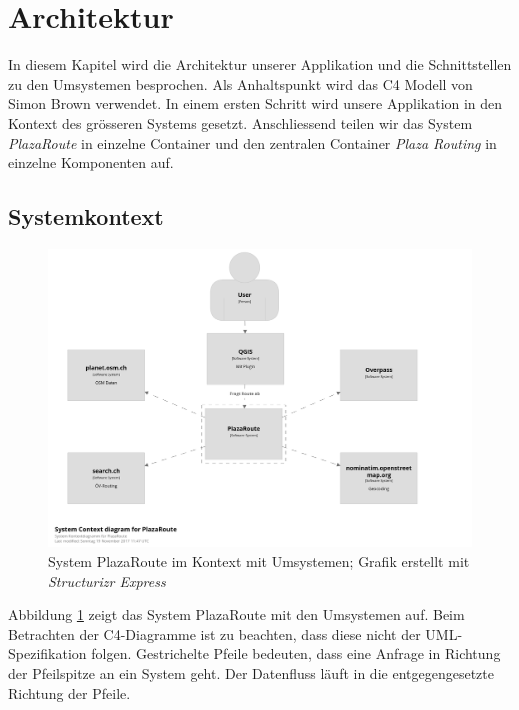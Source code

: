 
\section{Architektur}
\label{sec:Architektur}

In diesem Kapitel wird die Architektur unserer Applikation und die Schnittstellen zu den Umsystemen besprochen. Als Anhaltspunkt wird das C4 Modell \cite{c4model} von Simon Brown verwendet. In einem ersten Schritt wird unsere Applikation in den Kontext des grösseren Systems gesetzt. Anschliessend teilen wir das System \emph{PlazaRoute} in einzelne Container und den zentralen Container \emph{Plaza Routing} in einzelne Komponenten auf.

\subsection{Systemkontext}
\label{architektur:Systemkontext}

\begin{figure}[ht]
\centering
\includegraphics[width=1\linewidth]{projectdoc/img/system-context_diagram.png}
\caption[System Kontext Diagramm]{System PlazaRoute im Kontext mit Umsystemen; Grafik erstellt mit \emph{Structurizr Express}\cite{structurizr}}
\label{fig:system_context_diagram}
\end{figure}

Abbildung \ref{fig:system_context_diagram} zeigt das System PlazaRoute mit den Umsystemen auf. Beim Betrachten der C4-Diagramme ist zu beachten, dass diese nicht der \acs{UML}-Spezifikation folgen. Gestrichelte Pfeile bedeuten, dass eine Anfrage in Richtung der Pfeilspitze an ein System geht. Der Datenfluss läuft in die entgegengesetzte Richtung der Pfeile.

